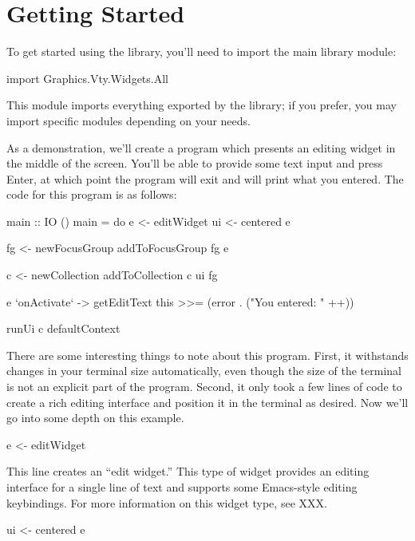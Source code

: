 \section{Getting Started}
\label{sec:gettingStarted}

To get started using the library, you'll need to import the main library
module:

\begin{haskellcode}
 import Graphics.Vty.Widgets.All
\end{haskellcode}

This module imports everything exported by the library; if you prefer,
you may import specific modules depending on your needs.

As a demonstration, we'll create a program which presents an editing
widget in the middle of the screen.  You'll be able to provide some
text input and press Enter, at which point the program will exit and
will print what you entered.  The code for this program is as follows:

\begin{haskellcode}
 main :: IO ()
 main = do
   e <- editWidget
   ui <- centered e

   fg <- newFocusGroup
   addToFocusGroup fg e

   c <- newCollection
   addToCollection c ui fg

   e `onActivate` \this ->
     getEditText this >>= (error . ("You entered: " ++))

   runUi c defaultContext
\end{haskellcode}

There are some interesting things to note about this program.  First,
it withstands changes in your terminal size automatically, even though
the size of the terminal is not an explicit part of the program.
Second, it only took a few lines of code to create a rich editing
interface and position it in the terminal as desired.  Now we'll go
into some depth on this example.

\begin{haskellcode}
 e <- editWidget
\end{haskellcode}

This line creates an “edit widget.”  This type of widget provides an
editing interface for a single line of text and supports some
Emacs-style editing keybindings.  For more information on this widget
type, see XXX.

\begin{haskellcode}
 ui <- centered e
\end{haskellcode}

